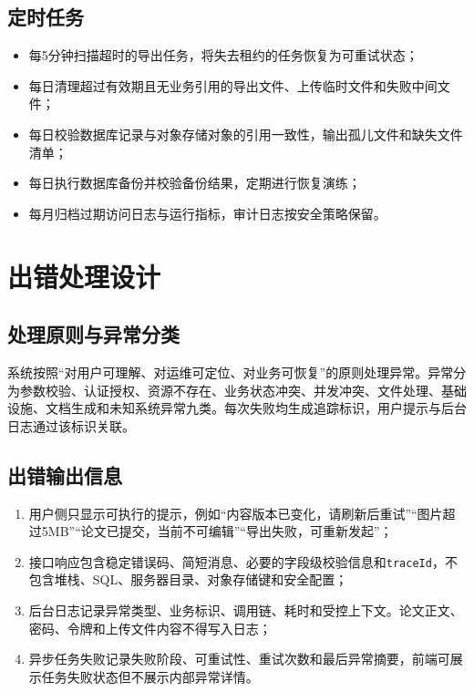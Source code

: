 \documentclass{../template/softeng}
\begin{document}
	\subsection{定时任务}
	\begin{itemize}
		\item 每5分钟扫描超时的导出任务，将失去租约的任务恢复为可重试状态；
		\item 每日清理超过有效期且无业务引用的导出文件、上传临时文件和失败中间文件；
		\item 每日校验数据库记录与对象存储对象的引用一致性，输出孤儿文件和缺失文件清单；
		\item 每日执行数据库备份并校验备份结果，定期进行恢复演练；
		\item 每月归档过期访问日志与运行指标，审计日志按安全策略保留。
	\end{itemize}
	
	\section{出错处理设计}
	
	\subsection{处理原则与异常分类}
	系统按照“对用户可理解、对运维可定位、对业务可恢复”的原则处理异常。异常分为参数校验、认证授权、资源不存在、业务状态冲突、并发冲突、文件处理、基础设施、文档生成和未知系统异常九类。每次失败均生成追踪标识，用户提示与后台日志通过该标识关联。
	
	\subsection{出错输出信息}
	\begin{enumerate}
		\item 用户侧只显示可执行的提示，例如“内容版本已变化，请刷新后重试”“图片超过5MB”“论文已提交，当前不可编辑”“导出失败，可重新发起”；
		\item 接口响应包含稳定错误码、简短消息、必要的字段级校验信息和\texttt{traceId}，不包含堆栈、SQL、服务器目录、对象存储键和安全配置；
		\item 后台日志记录异常类型、业务标识、调用链、耗时和受控上下文。论文正文、密码、令牌和上传文件内容不得写入日志；
		\item 异步任务失败记录失败阶段、可重试性、重试次数和最后异常摘要，前端可展示任务失败状态但不展示内部异常详情。
	\end{enumerate}
	
\end{document}
